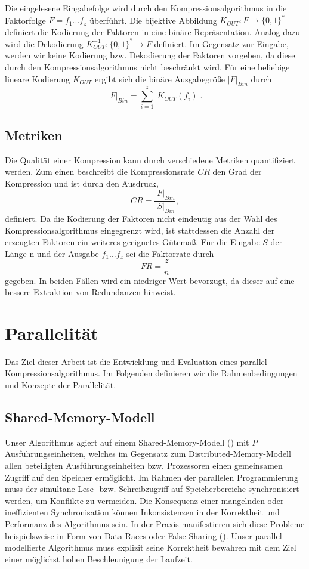 Die eingelesene Eingabefolge wird durch den Kompressionsalgorithmus in die Faktorfolge $F=f_1...f_z$ überführt. Die bijektive Abbildung $K_{OUT}: F \rightarrow \{0,1\}^*$
definiert die Kodierung der Faktoren in eine binäre Repräsentation. Analog dazu wird die Dekodierung $K^{-1}_{OUT}: \{0,1\}^* \rightarrow F$ definiert. Im Gegensatz zur Eingabe, 
werden wir keine Kodierung bzw. Dekodierung der Faktoren vorgeben, da diese durch den Kompressionsalgorithmus nicht beschränkt wird. Für eine beliebige lineare Kodierung $K_{OUT}$
ergibt sich die binäre Ausgabegröße $|F|_{Bin}$ durch
\begin{equation}
    |F|_{Bin} = \sum_{i=1}^{z} |K_{OUT}(f_i)|.
\end{equation}

\subsection{Metriken}
Die Qualität einer Kompression kann durch verschiedene Metriken quantifiziert werden. Zum einen beschreibt die Kompressionsrate $CR$ den Grad der Kompression und ist durch den
Ausdruck, 
\begin{equation}
    CR = \frac{|F|_{Bin}}{|S|_{Bin}},
\end{equation}
definiert.
Da die Kodierung der Faktoren nicht eindeutig aus der Wahl des Kompressionsalgorithmus eingegrenzt wird, ist stattdessen die Anzahl der erzeugten Faktoren ein
weiteres geeignetes Gütemaß. Für die Eingabe $S$ der Länge n und der Ausgabe $f_1...f_z$ sei die Faktorrate durch
\begin{equation}
    FR = \frac{z}{n}
\end{equation}
gegeben. In beiden Fällen wird ein niedriger Wert bevorzugt, da dieser auf eine bessere Extraktion von Redundanzen hinweist.

\section{Parallelität}
Das Ziel dieser Arbeit ist die Entwicklung und Evaluation eines parallel Kompressionsalgorithmus. Im Folgenden definieren wir die Rahmenbedingungen und Konzepte der Parallelität.

\subsection{Shared-Memory-Modell} \label{shared}
Unser Algorithmus agiert auf einem Shared-Memory-Modell (\cite{jaja}) mit $P$ Ausführungseinheiten, welches im Gegensatz zum Distributed-Memory-Modell allen beteiligten 
Ausführungseinheiten bzw. Prozessoren einen gemeinsamen Zugriff auf den Speicher ermöglicht. Im Rahmen der parallelen Programmierung muss der simultane Lese- bzw. Schreibzugriff auf
Speicherbereiche synchronisiert werden, um Konflikte zu vermeiden. Die Konsequenz einer mangelnden oder ineffizienten Synchronisation können Inkonsistenzen in der Korrektheit und
Performanz des Algorithmus sein. In der Praxis manifestieren sich diese Probleme beispielsweise in Form von Data-Races oder False-Sharing (\cite{parallelcomputing}). 
Unser parallel modellierte Algorithmus muss explizit seine Korrektheit bewahren mit dem Ziel einer möglichst hohen Beschleunigung der Laufzeit.

